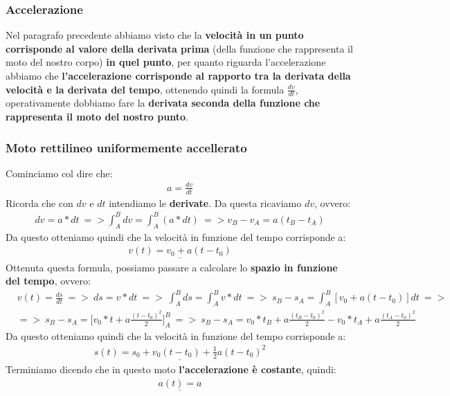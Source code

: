 		\subsubsection{Accelerazione}
			Nel paragrafo precedente abbiamo visto che la \textbf{velocità in un punto corrisponde al valore della derivata prima} (della funzione che rappresenta il moto del nostro corpo) \textbf{in quel punto}, per quanto riguarda l'accelerazione abbiamo che \textbf{l'accelerazione corrisponde al rapporto tra la derivata della velocità e la derivata del tempo}, ottenendo quindi la formula $\frac{dv}{dt}$, operativamente dobbiamo fare la \textbf{derivata seconda della funzione che rappresenta il moto del nostro punto}.

		\subsubsection{Moto rettilineo uniformemente accellerato}
			Cominciamo col dire che:
			\begin{align*}
				a=\frac{dv}{dt}
			\end{align*}
			Ricorda che con $dv$ e $dt$ intendiamo le \textbf{derivate}. Da questa ricaviamo $dv$, ovvero:
			\begin{align*}
				dv = a*dt\ => \int_A^B dv = \int_A^B (a*dt)\ => v_B-v_A = a(t_B-t_A)
			\end{align*}
			Da questo otteniamo quindi che la velocità in funzione del tempo corrisponde a: \label{Formule_moto_unif_acc}
			\begin{align*}
				\underline{v(t)=v_0+a(t-t_0)}
			\end{align*}
			Ottenuta questa formula, possiamo passare a calcolare lo \textbf{spazio in funzione del tempo}, ovvero:
			\begin{align*}
				&v(t) = \frac{ds}{dt}\ =>\ ds = v*dt\ =>\ \int_A^B ds = \int_A^B v*dt\ =>\ s_B-s_A = \int_A^B [v_0+a(t-t_0)] dt\ =>\ \\
				&=>\ s_B-s_A = \bigg[v_0*t+a\frac{(t-t_0)^2}{2}\bigg]_A^B\ =>\ s_B-s_A = v_0*t_B+a\frac{(t_B-t_0)^2}{2} - v_0*t_A+a\frac{(t_A-t_0)^2}{2}
			\end{align*}
			Da questo otteniamo quindi che la velocità in funzione del tempo corrisponde a:
			\begin{align*}
				\underline{s(t)=s_0+v_0(t-t_0)+\frac{1}{2}a(t-t_0)^2}
			\end{align*}
			Terminiamo dicendo che in questo moto \textbf{l'accelerazione è costante}, quindi:
			\begin{align*}
				\underline{a(t)= a}
			\end{align*}

